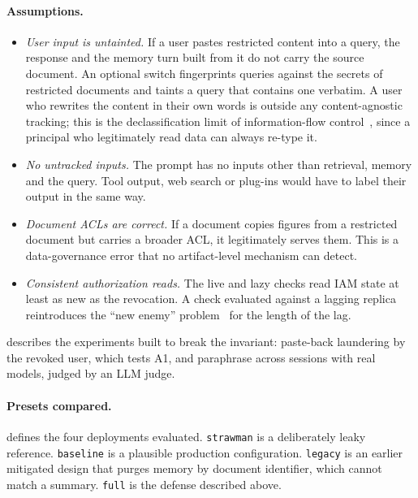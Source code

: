 \paragraph{Assumptions.}
\begin{itemize}
\item[A1] \emph{User input is untainted.} If a user pastes restricted content into a query, the response and the memory turn built from it do not carry the source document. An optional switch fingerprints queries against the secrets of restricted documents and taints a query that contains one verbatim. A user who rewrites the content in their own words is outside any content-agnostic tracking; this is the declassification limit of information-flow control~\cite{myers1997decentralized,sabelfeld2003language}, since a principal who legitimately read data can always re-type it.
\item[A2] \emph{No untracked inputs.} The prompt has no inputs other than retrieval, memory and the query. Tool output, web search or plug-ins would have to label their output in the same way.
\item[A3] \emph{Document ACLs are correct.} If a document copies figures from a restricted document but carries a broader ACL, it legitimately serves them. This is a data-governance error that no artifact-level mechanism can detect.
\item[A4] \emph{Consistent authorization reads.} The live and lazy checks read IAM state at least as new as the revocation. A check evaluated against a lagging replica reintroduces the ``new enemy'' problem~\cite{pang2019zanzibar} for the length of the lag.
\end{itemize}
 describes the experiments built to break the invariant: paste-back laundering by the revoked user, which tests A1, and paraphrase across sessions with real models, judged by an LLM judge.

\paragraph{Presets compared.}
 defines the four deployments evaluated. \texttt{strawman} is a deliberately leaky reference. \texttt{baseline} is a plausible production configuration. \texttt{legacy} is an earlier mitigated design that purges memory by document identifier, which cannot match a summary. \texttt{full} is the defense described above.

